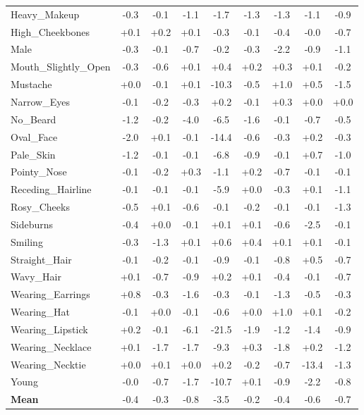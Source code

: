 \begin{table}[p]
\begin{tabular}{l|cccccccc}
Heavy\_Makeup & -0.3 & -0.1 & -1.1 & -1.7 & -1.3 & -1.3 & -1.1 & -0.9 \\
High\_Cheekbones & +0.1 & +0.2 & +0.1 & -0.3 & -0.1 & -0.4 & -0.0 & -0.7 \\
Male & -0.3 & -0.1 & -0.7 & -0.2 & -0.3 & -2.2 & -0.9 & -1.1 \\
Mouth\_Slightly\_Open & -0.3 & -0.6 & +0.1 & +0.4 & +0.2 & +0.3 & +0.1 & -0.2 \\
Mustache & +0.0 & -0.1 & +0.1 & -10.3 & -0.5 & +1.0 & +0.5 & -1.5 \\
Narrow\_Eyes & -0.1 & -0.2 & -0.3 & +0.2 & -0.1 & +0.3 & +0.0 & +0.0 \\
No\_Beard & -1.2 & -0.2 & -4.0 & -6.5 & -1.6 & -0.1 & -0.7 & -0.5 \\
Oval\_Face & -2.0 & +0.1 & -0.1 & -14.4 & -0.6 & -0.3 & +0.2 & -0.3 \\
Pale\_Skin & -1.2 & -0.1 & -0.1 & -6.8 & -0.9 & -0.1 & +0.7 & -1.0 \\
Pointy\_Nose & -0.1 & -0.2 & +0.3 & -1.1 & +0.2 & -0.7 & -0.1 & -0.1 \\
Receding\_Hairline & -0.1 & -0.1 & -0.1 & -5.9 & +0.0 & -0.3 & +0.1 & -1.1 \\
Rosy\_Cheeks & -0.5 & +0.1 & -0.6 & -0.1 & -0.2 & -0.1 & -0.1 & -1.3 \\
Sideburns & -0.4 & +0.0 & -0.1 & +0.1 & +0.1 & -0.6 & -2.5 & -0.1 \\
Smiling & -0.3 & -1.3 & +0.1 & +0.6 & +0.4 & +0.1 & +0.1 & -0.1 \\
Straight\_Hair & -0.1 & -0.2 & -0.1 & -0.9 & -0.1 & -0.8 & +0.5 & -0.7 \\
Wavy\_Hair & +0.1 & -0.7 & -0.9 & +0.2 & +0.1 & -0.4 & -0.1 & -0.7 \\
Wearing\_Earrings & +0.8 & -0.3 & -1.6 & -0.3 & -0.1 & -1.3 & -0.5 & -0.3 \\
Wearing\_Hat & -0.1 & +0.0 & -0.1 & -0.6 & +0.0 & +1.0 & +0.1 & -0.2 \\
Wearing\_Lipstick & +0.2 & -0.1 & -6.1 & -21.5 & -1.9 & -1.2 & -1.4 & -0.9 \\
Wearing\_Necklace & +0.1 & -1.7 & -1.7 & -9.3 & +0.3 & -1.8 & +0.2 & -1.2 \\
Wearing\_Necktie & +0.0 & +0.1 & +0.0 & +0.2 & -0.2 & -0.7 & -13.4 & -1.3 \\
Young & -0.0 & -0.7 & -1.7 & -10.7 & +0.1 & -0.9 & -2.2 & -0.8 \\
\midrule
\textbf{Mean} & -0.4 & -0.3 & -0.8 & -3.5 & -0.2 & -0.4 & -0.6 & -0.7 \\
\bottomrule
\end{tabular}
\end{table}

